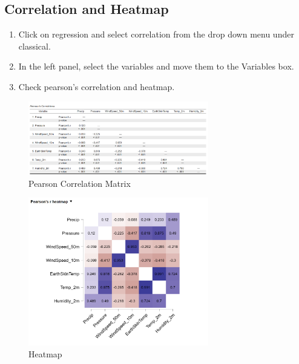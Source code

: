 \subsection{Correlation and Heatmap}

\begin{enumerate}
    \item Click on regression and select correlation from the drop down menu under classical.
    \item In the left panel, select the variables and move them to the Variables box.
    \item Check pearson’s correlation and heatmap.
\end{enumerate}

\begin{figure}[h]
\centering
\includegraphics[width=0.7\textwidth]{figures/corr_jasp.png}
\caption{Pearson Correlation Matrix}
\end{figure}

\begin{figure}[h]
\centering
\includegraphics[width=0.7\textwidth]{figures/heatmap_jasp.png}
\caption{Heatmap}
\end{figure}

\clearpage